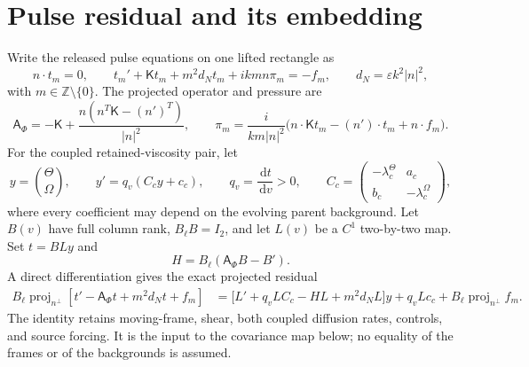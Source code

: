 \documentclass[11pt]{article}
\newcommand{\dd}{\,\mathrm d}
\newcommand{\proj}{\operatorname{proj}}
\begin{document}
\section{Pulse residual and its embedding}
Write the released pulse equations on one lifted rectangle as
\begin{equation}
 n\cdot t_m=0,\qquad t_m'+\mathsf Kt_m+m^2d_Nt_m+ikm n\pi_m=-f_m,
 \qquad d_N=\varepsilon k^2|n|^2,
 \label{eq:source}
\end{equation}
with $m\in\mathbb Z\setminus\{0\}$.  The projected operator and pressure are
\begin{equation}
 \mathsf A_\Phi=-\mathsf K+\frac{n(n^T\mathsf K-(n')^T)}{|n|^2},\qquad
 \pi_m=\frac{i}{km|n|^2}\bigl(n\cdot\mathsf Kt_m-(n')\cdot t_m+n\cdot f_m\bigr).
 \label{eq:sourceproj}
\end{equation}
For the coupled retained-viscosity pair, let
\begin{equation}
 y=\binom{\Theta}{\Omega},\qquad y'=q_v(C_cy+c_c),\qquad q_v=\frac{\dd t}{\dd v}>0,
 \qquad C_c=\begin{pmatrix}-\lambda_c^\Theta&a_c\\ b_c&-\lambda_c^\Omega\end{pmatrix},
 \label{eq:pair}
\end{equation}
where every coefficient may depend on the evolving parent background.  Let $B(v)$ have full
column rank, $B_\ell B=I_2$, and let $L(v)$ be a $C^1$ two-by-two map.  Set
$t=B Ly$ and
\begin{equation}
 H=B_\ell(\mathsf A_\Phi B-B').
\end{equation}
A direct differentiation gives the exact projected residual
\begin{align}
 B_\ell\proj_{n^\perp}[t'-\mathsf A_\Phi t+m^2d_Nt+f_m]
 &=\bigl[L'+q_vLC_c-HL+m^2d_NL\bigr]y+q_vLc_c
   +B_\ell\proj_{n^\perp}f_m. \label{eq:bridge}
\end{align}
The identity retains moving-frame, shear, both coupled diffusion rates, controls, and source
forcing.  It is the input to the covariance map below; no equality of the frames or of the
backgrounds is assumed.
\end{document}
